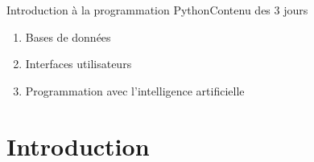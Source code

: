 \documentclass{beamer}
\begin{document}
\begin{frame}{Introduction à la programmation Python}{Contenu des 3 jours}
\begin{multicols}{3}
\begin{tiny}
\begin{enumerate}
                    \item Bases de données
                    \begin{itemize}
                    \end{itemize}

                    \item Interfaces utilisateurs
                    \begin{itemize}
                    \end{itemize}

                    \item Programmation avec l'intelligence artificielle
                \end{enumerate}
            \end{tiny}
        \end{multicols}
    \end{frame}


    \section{Introduction}\label{sec:introduction}
\end{document}
